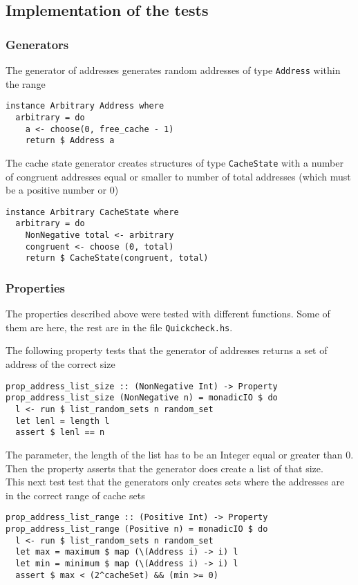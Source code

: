 \documentclass[11pt]{article}
\begin{document}
\clearpage
\subsection{Implementation of the tests}
\subsubsection{Generators}
The generator of addresses generates random addresses of type \texttt{Address} within the range
\begin{verbatim}
instance Arbitrary Address where
  arbitrary = do
    a <- choose(0, free_cache - 1)
    return $ Address a
\end{verbatim}

The cache state generator creates structures of type \texttt{CacheState} with a number of congruent addresses equal or smaller to number of total addresses (which must be a positive number or 0)
\begin{verbatim}
instance Arbitrary CacheState where
  arbitrary = do
    NonNegative total <- arbitrary
    congruent <- choose (0, total)
    return $ CacheState(congruent, total)
\end{verbatim}

\subsubsection{Properties}
The properties described above were tested with different functions. Some of them are here, the rest are in the file \texttt{Quickcheck.hs}.

The following property tests that the generator of addresses returns a set of address of the correct size
\begin{verbatim}
prop_address_list_size :: (NonNegative Int) -> Property
prop_address_list_size (NonNegative n) = monadicIO $ do
  l <- run $ list_random_sets n random_set
  let lenl = length l
  assert $ lenl == n
\end{verbatim}
The parameter, the length of the list has to be an Integer equal or greater than 0. Then the property asserts that the generator does create a list of that size.\\

This next test test that the generators only creates sets where the addresses are in the correct range of cache sets

\begin{verbatim}
prop_address_list_range :: (Positive Int) -> Property
prop_address_list_range (Positive n) = monadicIO $ do
  l <- run $ list_random_sets n random_set
  let max = maximum $ map (\(Address i) -> i) l
  let min = minimum $ map (\(Address i) -> i) l
  assert $ max < (2^cacheSet) && (min >= 0)
\end{verbatim}
\end{document}
